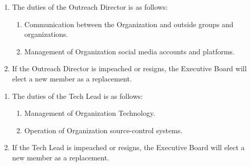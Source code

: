 \begin{enumerate}
	\item The duties of the Outreach Director is as follows:
		\begin{enumerate}
			\item Communication between the Organization and outside groups and organizations.

			\item Management of Organization social media accounts and platforms.
		\end{enumerate}

	\item If the Outreach Director is impeached or resigns, the Executive Board
		will elect a new member as a replacement.
\end{enumerate}

\begin{enumerate}
	\item The duties of the Tech Lead is as follows:
		\begin{enumerate}
			\item Management of Organization Technology.

			\item Operation of Organization source-control systems.
		\end{enumerate}

	\item If the Tech Lead is impeached or resigns, the Executive Board will elect
		a new member as a replacement.
\end{enumerate}
